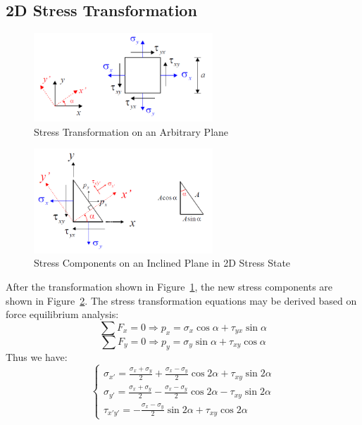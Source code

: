 \documentclass[en,hazy,cyan,8pt,normal]{elegantnote}
\begin{document}
  \subsection{2D Stress Transformation}
    \begin{figure}[H]
      \centering
      \includegraphics[width=0.6\textwidth]{image/005.png}
      \caption{Stress Transformation on an Arbitrary Plane}
      \label{fig:005}
    \end{figure}
    \begin{figure}[H]
      \centering
      \includegraphics[width=0.6\textwidth]{image/006.png}
      \caption{Stress Components on an Inclined Plane in 2D Stress State}
      \label{fig:006}
    \end{figure}
    After the transformation shown in Figure~\ref{fig:005}, the new stress components are shown in Figure~\ref{fig:006}.
    The stress transformation equations may be derived based on force equilibrium analysis:
    \begin{equation}\label{eq:008}
      \sum F_x=0\Rightarrow p_x=\sigma_x\cos\alpha+\tau_{yx}\sin\alpha
    \end{equation}
    \begin{equation}\label{eq:009}
      \sum F_y=0\Rightarrow p_y=\sigma_y\sin\alpha+\tau_{xy}\cos\alpha
    \end{equation}
    Thus we have:
    \begin{equation}\label{eq:010}
      \begin{cases}
        \displaystyle \sigma_{x'}=\frac{\sigma_x+\sigma_y}{2}+\frac{\sigma_x-\sigma_y}{2}\cos2\alpha+\tau_{xy}\sin2\alpha\\
        \displaystyle \sigma_{y'}=\frac{\sigma_x+\sigma_y}{2}-\frac{\sigma_x-\sigma_y}{2}\cos2\alpha-\tau_{xy}\sin2\alpha\\
        \displaystyle \tau_{x'y'}=-\frac{\sigma_x-\sigma_y}{2}\sin2\alpha+\tau_{xy}\cos2\alpha
      \end{cases}
    \end{equation}
\end{document}
